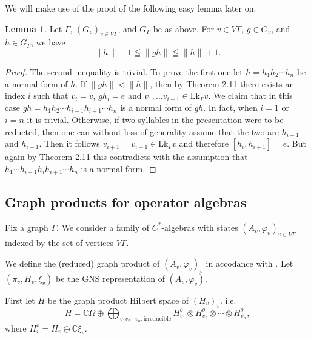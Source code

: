 \documentclass{amsart}
\theoremstyle{definition}
\newtheorem{lemma}[theorem]{Lemma}
\begin{document}
We will make use of the proof of the following easy lemma later on. 

\begin{lemma}
Let $\Gamma$, $(G_v)_{v\in V\Gamma}$, and $G_{\Gamma}$ be as above. 
For $v\in V\Gamma$, $g\in G_v$, and $h\in G_{\Gamma}$, we have 
\[
\|h \|-1 \leqq \| gh \|\leqq \|h \|+1. 
\]
\end{lemma}
\begin{proof}
The second inequality is trivial. 
To prove the first one let $h=h_1h_2\cdots h_n$ be a normal form of $h$. 
If $\|gh \| < \| h \|$, then by Theorem 2.11 there exists an index $i$ such that $v_i=v$, $gh_i=e$ and $v_1, \ldots v_{i-1}\in \mathrm{Lk}_{\Gamma}v$. 
We claim that in this case $gh=h_1h_2\cdots h_{i-1}h_{i+1}\cdots h_n$ is a normal form of $gh$. 
In fact, when $i=1$ or $i=n$ it is trivial. Otherwise, if two syllables in the presentation were to be reducted, then one can without loss of generality assume that the two are $h_{i-1}$ and $h_{i+1}$. Then it follows $v_{i+1}=v_{i-1}\in \mathrm{Lk}_{\Gamma}v$ and therefore $[h_i, h_{i+1}]=e$. But again by Theorem 2.11 this contradicts with
the assumption that $h_1\cdots h_{i-1}h_ih_{i+1}\cdots h_n$ is a normal form. 
\end{proof}




\subsection{Graph products for operator algebras}

Fix a graph $\Gamma$. We consider a family of $C^{\ast}$-algebras with states 
$(A_v, \varphi_v)_{v\in V\Gamma}$ indexed by the set of vertices $V\Gamma$. 

We define the (reduced) graph product of $(A_v, \varphi_v)_v$ in accodance with \cite{cf}. 
Let $(\pi_v, H_v, \xi_v)$ be the GNS representation of $(A_v, \varphi_v)$. 

First let $H$ be the graph product Hilbert space of $(H_v)_v$. i.e.
\[
H = \mathbb{C}\Omega \oplus \bigoplus_{v_1v_2\cdots v_n : \text{irreducible}} H_{v_1}^o \otimes H_{v_2}^o \otimes \cdots \otimes H_{v_n}^o, 
\]
where $H_v^o = H_v\ominus \mathbb{C}\xi_v$. 
\end{document}
